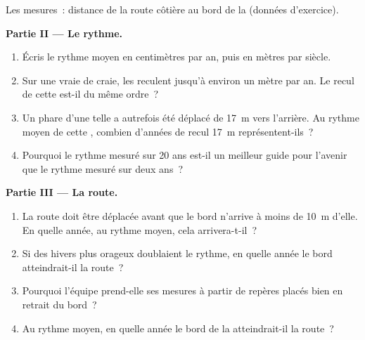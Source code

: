 \begin{problem}
\begin{omfigure}
{\small Les mesures~: distance de la route côtière au bord de la 
(données d'exercice).}
\label{fig:g9:landforms:survey}
\end{omfigure}

\noindent\textbf{Partie II --- Le rythme.}\par\nopagebreak
\begin{enumerate}[resume, beginpenalty=10000]
  \item Écris le rythme moyen en centimètres par an, puis en mètres par
        siècle.
  \item Sur une vraie  de craie, les  reculent jusqu'à environ
        un mètre par an. Le recul de cette  est-il du même ordre~?
  \item Un phare d'une telle  a autrefois été déplacé de \qty{17}{m}
        vers l'arrière. Au rythme moyen de cette , combien d'années
        de recul \qty{17}{m} représentent-ils~?
  \item Pourquoi le rythme mesuré sur 20 ans est-il un meilleur guide pour
        l'avenir que le rythme mesuré sur deux ans~?
\end{enumerate}

\noindent\textbf{Partie III --- La route.}\par\nopagebreak
\begin{enumerate}[resume, beginpenalty=10000]
  \item La route doit être déplacée avant que le bord n'arrive à moins de
        \qty{10}{m} d'elle. En quelle année, au rythme moyen, cela
        arrivera-t-il~?
  \item Si des hivers plus orageux doublaient le rythme, en quelle année le
        bord atteindrait-il la route~?
  \item Pourquoi l'équipe prend-elle ses mesures à partir de repères placés
        bien en retrait du bord~?
  \item Au rythme moyen, en quelle année le bord de la 
        atteindrait-il la route~?
\end{enumerate}
\end{problem}
